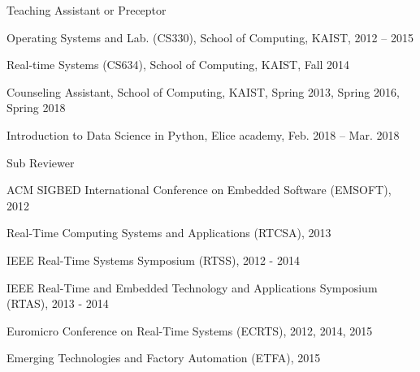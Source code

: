 \documentclass[11pt,letterpaper]{article}
\begin{document}
\begin{envtime}[]{Teaching Assistant or Preceptor}{}
	\item{Operating Systems and Lab. (CS330), School of Computing, KAIST}{, 2012 -- 2015}
	\item{Real-time Systems (CS634), School of Computing, KAIST}{, Fall 2014}
	\item{Counseling Assistant, School of Computing, KAIST}{, Spring 2013, Spring 2016, Spring 2018}
	\item{Introduction to Data Science in Python, Elice academy}{, Feb. 2018 -- Mar. 2018}
\end{envtime}


\begin{envtime}[]{Sub Reviewer}{}
	\item{ACM SIGBED International Conference on Embedded Software (EMSOFT)}{, 2012}
	\item{Real-Time Computing Systems and Applications (RTCSA)}{, 2013}
	\item{IEEE Real-Time Systems Symposium (RTSS)}{, 2012 - 2014}
	\item{IEEE Real-Time and Embedded Technology and Applications Symposium (RTAS)}{, 2013 - 2014}
	\item{Euromicro Conference on Real-Time Systems (ECRTS)}{, 2012, 2014, 2015}
	\item{Emerging Technologies and Factory Automation (ETFA)}{, 2015}
						
\end{envtime}
\end{document}
